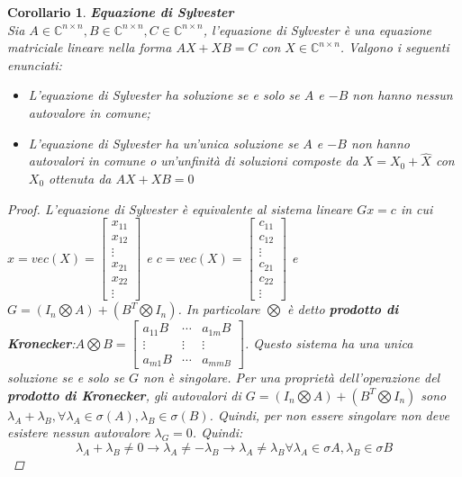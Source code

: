 \documentclass{article}
\newtheorem{corollary}{\textbf{Corollario}}
\theoremstyle{definition}
\begin{document}
\begin{corollary}{\textbf{Equazione di Sylvester}}\\
    Sia \(A\in\mathbb{C}^{n\times n},B\in\mathbb{C}^{n\times n},C\in\mathbb{C}^{n\times n}\), l'equazione di Sylvester è una equazione matriciale lineare nella forma \(AX+XB=C\) con \(X\in\mathbb{C}^{n\times n}\). Valgono i seguenti enunciati:\begin{itemize}
        \item L'equazione di Sylvester ha soluzione se e solo se \(A\) e \(-B\) non hanno nessun autovalore in comune;
        \item L'equazione di Sylvester ha un'unica soluzione se \(A\) e \(-B\) non hanno autovalori in comune o un'unfinità di soluzioni composte da \(X=X_{0}+\hat{X}\) con \(X_{0}\) ottenuta da \(AX+XB=0\)
    \end{itemize}
    \begin{proof}
        L'equazione di Sylvester è equivalente al sistema lineare \(Gx=c\) in cui \(x= vec(X)=\begin{bmatrix}
            x_{11}\\x_{12}\\\vdots \\x_{21}\\x_{22}\\\vdots
        \end{bmatrix}\) e \(c=vec(X)=\begin{bmatrix}
            c_{11}\\c_{12}\\\vdots \\c_{21}\\c_{22}\\\vdots
        \end{bmatrix}\) e \(G=(I_{n}\bigotimes A)+(B^{T}\bigotimes I_{n})\). In particolare \(\bigotimes \) è detto \textbf{prodotto di Kronecker}:\(A\bigotimes B=\begin{bmatrix}
            a_{11}B&\cdots  &a_{1m}B\\
            \vdots & \vdots &\vdots \\
            a_{m1}B& \cdots & a_{mmB}
        \end{bmatrix}\). Questo sistema ha una unica soluzione se e solo se \(G\) non è singolare. Per una proprietà dell'operazione del \textbf{prodotto di Kronecker}, gli autovalori di \(G=(I_{n}\bigotimes A)+(B^{T}\bigotimes I_{n})\) sono \(\lambda_{A}+\lambda_{B},\forall \lambda_{A}\in\sigma{(A)},\lambda_{B}\in\sigma{(B)}\). Quindi, per non essere singolare non deve esistere nessun autovalore \(\lambda_{G}=0\). Quindi:
        \begin{equation*}
            \lambda_{A}+\lambda_{B}\neq 0\rightarrow \lambda_{A}\neq-\lambda_{B}\rightarrow \lambda_{A}\neq\lambda_{B}\forall \lambda_{A}\in\sigma{A},\lambda_{B}\in\sigma{B}
        \end{equation*}
    \end{proof}
\end{corollary}
\end{document}
